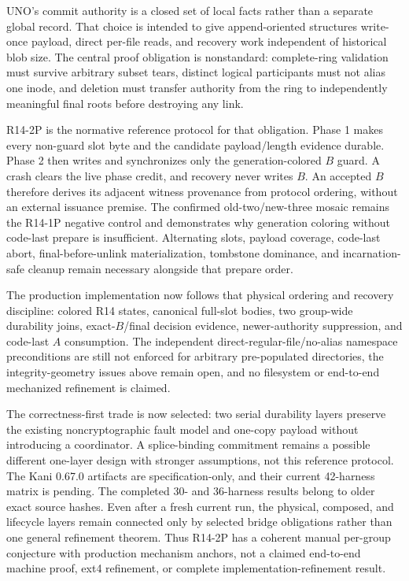 \documentclass[10pt,twocolumn]{article}
\theoremstyle{remark}
\begin{document}
UNO's commit authority is a closed set of local facts rather than a separate global record. That
choice is intended to give append-oriented structures write-once payload, direct per-file reads,
and recovery work independent of historical blob size. The central proof obligation is
nonstandard: complete-ring validation must survive arbitrary subset tears, distinct logical
participants must not alias one inode, and deletion must transfer authority from the ring to
independently meaningful final roots before destroying any link.

R14-2P is the normative reference protocol for that obligation. Phase 1 makes every non-guard slot
byte and the candidate payload/length evidence durable. Phase 2 then writes and synchronizes only
the generation-colored $B$ guard. A crash clears the live phase credit, and recovery never writes
$B$. An accepted $B$ therefore derives its adjacent witness provenance from protocol ordering,
without an external issuance premise. The confirmed old-two/new-three mosaic remains the R14-1P
negative control and demonstrates why generation coloring without code-last prepare is
insufficient. Alternating slots, payload coverage, code-last abort, final-before-unlink
materialization, tombstone dominance, and incarnation-safe cleanup remain necessary alongside that
prepare order.

The production implementation now follows that physical ordering and recovery discipline: colored
R14 states, canonical full-slot bodies, two group-wide durability joins, exact-$B$/final decision
evidence, newer-authority suppression, and code-last $A$ consumption. The independent
direct-regular-file/no-alias namespace preconditions are still not enforced for arbitrary
pre-populated directories, the integrity-geometry issues above remain open, and no filesystem or
end-to-end mechanized refinement is claimed.

The correctness-first trade is now selected: two serial durability layers preserve the existing
noncryptographic fault model and one-copy payload without introducing a coordinator. A
splice-binding commitment remains a possible different one-layer design with stronger assumptions,
not this reference protocol. The Kani 0.67.0 artifacts are specification-only, and their current
42-harness matrix is pending. The completed 30- and 36-harness results belong to older exact source
hashes.
Even after a fresh current run, the physical, composed, and lifecycle layers remain connected only
by selected bridge obligations rather than one general refinement theorem. Thus R14-2P has a
coherent manual per-group conjecture with production mechanism anchors, not a claimed end-to-end
machine proof, ext4 refinement, or complete implementation-refinement result.
\end{document}
